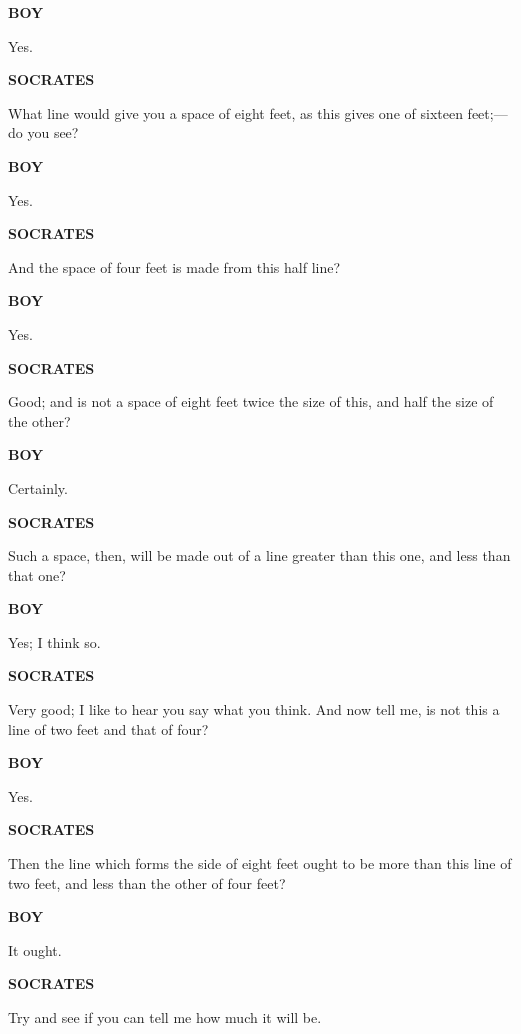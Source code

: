 \documentclass[11pt,letter]{article}
\begin{document}
\par \textbf{BOY}
\par   Yes.

\par \textbf{SOCRATES}
\par   What line would give you a space of eight feet, as this gives one of sixteen feet;—do you see?

\par \textbf{BOY}
\par   Yes.

\par \textbf{SOCRATES}
\par   And the space of four feet is made from this half line?

\par \textbf{BOY}
\par   Yes.

\par \textbf{SOCRATES}
\par   Good; and is not a space of eight feet twice the size of this, and half the size of the other?

\par \textbf{BOY}
\par   Certainly.

\par \textbf{SOCRATES}
\par   Such a space, then, will be made out of a line greater than this one, and less than that one?

\par \textbf{BOY}
\par   Yes; I think so.

\par \textbf{SOCRATES}
\par   Very good; I like to hear you say what you think. And now tell me, is not this a line of two feet and that of four?

\par \textbf{BOY}
\par   Yes.

\par \textbf{SOCRATES}
\par   Then the line which forms the side of eight feet ought to be more than this line of two feet, and less than the other of four feet?

\par \textbf{BOY}
\par   It ought.

\par \textbf{SOCRATES}
\par   Try and see if you can tell me how much it will be.
\end{document}

